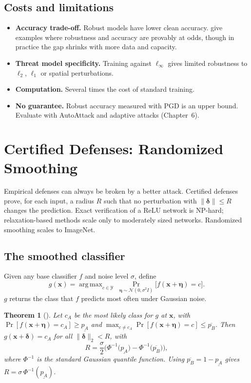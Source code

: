 \documentclass[10pt,a4paper]{extarticle}
\newtheorem{theorem}{Theorem}[section]
\theoremstyle{definition}
\newcommand{\Y}{\mathcal{Y}}
\newcommand{\x}{\mathbf{x}}
\newcommand{\bdelta}{\boldsymbol{\delta}}
\DeclareMathOperator*{\argmax}{arg\,max}
\begin{document}
\subsection{Costs and limitations}

\begin{itemize}
  \item \textbf{Accuracy trade-off.} Robust models have lower clean accuracy. \citet{tsipras2019robustness} give examples where robustness and accuracy are provably at odds, though in practice the gap shrinks with more data and capacity.
  \item \textbf{Threat model specificity.} Training against \(\ell_\infty\) gives limited robustness to \(\ell_2\), \(\ell_1\) or spatial perturbations.
  \item \textbf{Computation.} Several times the cost of standard training.
  \item \textbf{No guarantee.} Robust accuracy measured with PGD is an upper bound. Evaluate with AutoAttack \citep{croce2020reliable} and adaptive attacks (Chapter~6).
\end{itemize}

\section{Certified Defenses: Randomized Smoothing}

Empirical defenses can always be broken by a better attack. Certified defenses prove, for each input, a radius \(R\) such that no perturbation with \(\|\bdelta\|\le R\) changes the prediction. Exact verification of a ReLU network is NP-hard; relaxation-based methods \citep{wong2018provable,gowal2019ibp} scale only to moderately sized networks. Randomized smoothing scales to ImageNet.

\subsection{The smoothed classifier}

Given any base classifier \(f\) and noise level \(\sigma\), define
\begin{equation}\label{eq:smooth}
g(\x) = \argmax_{c\in\Y}\;\Pr_{\boldsymbol{\eta}\sim\mathcal{N}(0,\sigma^2I)}\big[f(\x+\boldsymbol{\eta})=c\big].
\end{equation}
\(g\) returns the class that \(f\) predicts most often under Gaussian noise.

\begin{theorem}[\citealp{cohen2019certified}]
Let \(c_A\) be the most likely class for \(g\) at \(\x\), with \(\Pr[f(\x+\boldsymbol{\eta})=c_A]\ge\underline{p_A}\) and \(\max_{c\neq c_A}\Pr[f(\x+\boldsymbol{\eta})=c]\le\overline{p_B}\). Then \(g(\x+\bdelta)=c_A\) for all \(\|\bdelta\|_2<R\), with
\[
R=\frac{\sigma}{2}\Big(\Phi^{-1}\big(\underline{p_A}\big)-\Phi^{-1}\big(\overline{p_B}\big)\Big),
\]
where \(\Phi^{-1}\) is the standard Gaussian quantile function. Using \(\overline{p_B}=1-\underline{p_A}\) gives \(R=\sigma\,\Phi^{-1}(\underline{p_A})\).
\end{theorem}
\end{document}
